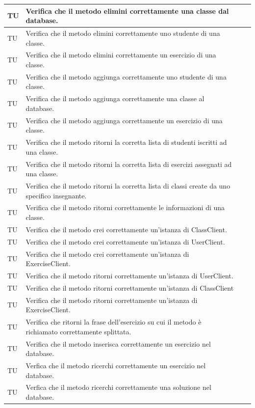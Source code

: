 \begin{longtable}{|>{\centering\arraybackslash}m{1.6cm}|>{\centering\arraybackslash}m{6.41cm}|>{\centering\arraybackslash}m{3.1cm}| c |}
		TU & Verifica che il metodo elimini correttamente una classe dal database.  \\ \hline
		TU & Verifica che il metodo elimini correttamente uno studente di una classe.  \\ \hline
		TU & Verifica che il metodo elimini correttamente un esercizio di una classe.  \\ \hline
		TU & Verifica che il metodo aggiunga correttamente uno studente di una classe.  \\ \hline
		TU & Verifica che il metodo aggiunga correttamente una classe al database. \\ \hline
		TU & Verifica che il metodo aggiunga correttamente un esercizio di una classe.  \\ \hline
		TU & Verifica che il metodo ritorni la corretta lista di studenti iscritti ad una classe.  \\ \hline
		TU & Verifica che il metodo ritorni la corretta lista di esercizi assegnati ad una classe.  \\ \hline
		TU & Verifica che il metodo ritorni la corretta lista di classi create da uno specifico insegnante.  \\ \hline
		TU & Verifica che il metodo ritorni correttamente le informazioni di una classe.  \\ \hline
		TU & Verifica che il metodo crei correttamente un'istanza di ClassClient.  \\ \hline
		TU & Verifica che il metodo crei correttamente un'istanza di UserClient.  \\ \hline
		TU & Verifica che il metodo crei correttamente un'istanza di ExerciseClient.  \\ \hline
		TU & Verifica che il metodo ritorni correttamente un'istanza di UserClient.  \\ \hline
		TU & Verifica che il metodo ritorni correttamente un'istanza di ClassClient  \\ \hline
		TU & Verifica che il metodo ritorni correttamente un'istanza di ExerciseClient.  \\ \hline
		TU & Verifica che ritorni la frase dell'esercizio su cui il metodo è richiamato correttamente splittata.  \\ \hline
		TU & Verifica che il metodo inserisca correttamente un esercizio nel database.  \\ \hline
		TU & Verfica che il metodo ricerchi correttamente un esercizio nel database.  \\ \hline
		TU & Verfica che il metodo ricerchi correttamente una soluzione nel database.  \\ \hline

\end{longtable}
